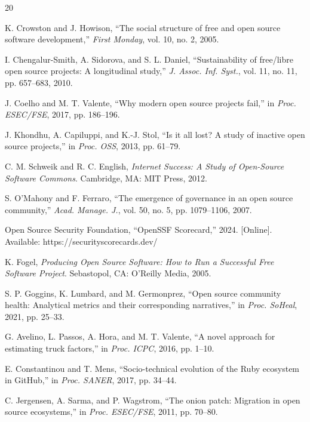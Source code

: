 \documentclass[conference]{IEEEtran}
\begin{document}

\begin{thebibliography}{20}

 K. Crowston and J. Howison, ``The social structure of free and open source software development,'' \textit{First Monday}, vol. 10, no. 2, 2005.

 I. Chengalur-Smith, A. Sidorova, and S. L. Daniel, ``Sustainability of free/libre open source projects: A longitudinal study,'' \textit{J. Assoc. Inf. Syst.}, vol. 11, no. 11, pp. 657--683, 2010.

 J. Coelho and M. T. Valente, ``Why modern open source projects fail,'' in \textit{Proc. ESEC/FSE}, 2017, pp. 186--196.

 J. Khondhu, A. Capiluppi, and K.-J. Stol, ``Is it all lost? A study of inactive open source projects,'' in \textit{Proc. OSS}, 2013, pp. 61--79.

 C. M. Schweik and R. C. English, \textit{Internet Success: A Study of Open-Source Software Commons}. Cambridge, MA: MIT Press, 2012.

 S. O'Mahony and F. Ferraro, ``The emergence of governance in an open source community,'' \textit{Acad. Manage. J.}, vol. 50, no. 5, pp. 1079--1106, 2007.

 Open Source Security Foundation, ``OpenSSF Scorecard,'' 2024. [Online]. Available: https://securityscorecards.dev/

 K. Fogel, \textit{Producing Open Source Software: How to Run a Successful Free Software Project}. Sebastopol, CA: O'Reilly Media, 2005.

 S. P. Goggins, K. Lumbard, and M. Germonprez, ``Open source community health: Analytical metrics and their corresponding narratives,'' in \textit{Proc. SoHeal}, 2021, pp. 25--33.

 G. Avelino, L. Passos, A. Hora, and M. T. Valente, ``A novel approach for estimating truck factors,'' in \textit{Proc. ICPC}, 2016, pp. 1--10.

 E. Constantinou and T. Mens, ``Socio-technical evolution of the Ruby ecosystem in GitHub,'' in \textit{Proc. SANER}, 2017, pp. 34--44.

 C. Jergensen, A. Sarma, and P. Wagstrom, ``The onion patch: Migration in open source ecosystems,'' in \textit{Proc. ESEC/FSE}, 2011, pp. 70--80.


\end{thebibliography}
\end{document}
